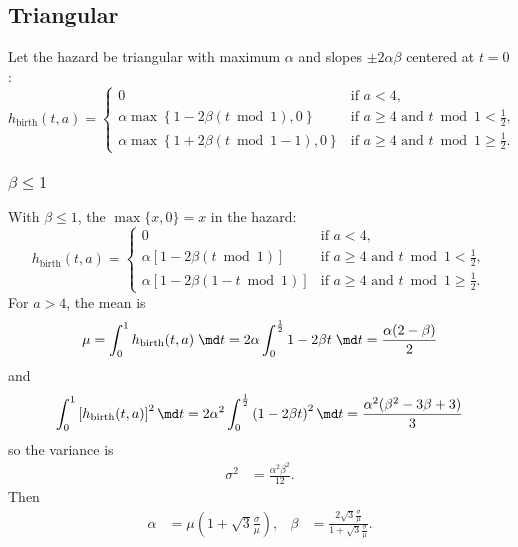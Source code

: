 \documentclass{jpmarticle}
\begin{document}
\subsection{Triangular}

Let the hazard be triangular with maximum $\alpha$ and slopes
$\pm 2 \alpha \beta$ centered at $t = 0$:
\begin{equation}
  h_{\text{birth}} (t, a) =
  \begin{cases}
    0 & \text{if $a < 4$},
    \\
    \alpha \max\left\{1 - 2 \beta (t \bmod 1), 0\right\}
    & \text{if $a \geq 4$ and $t \bmod 1 < \frac{1}{2}$},
    \\
    \alpha \max\left\{1 + 2 \beta (t \bmod 1 - 1), 0\right\}
    & \text{if $a \geq 4$ and $t \bmod 1 \geq \frac{1}{2}$}.
  \end{cases}
\end{equation}

\subsubsection{$\beta \leq 1$}

With $\beta \leq 1$, the $\max\{x, 0\} = x$ in the hazard:
\begin{equation}
  h_{\text{birth}} (t, a) =
  \begin{cases}
    0 & \text{if $a < 4$},
    \\
    \alpha \left[1 - 2 \beta (t \bmod 1)\right]
    & \text{if $a \geq 4$ and $t \bmod 1 < \frac{1}{2}$},
    \\
    \alpha \left[1 - 2 \beta (1 - t \bmod 1)\right]
    & \text{if $a \geq 4$ and $t \bmod 1 \geq \frac{1}{2}$}.
  \end{cases}
\end{equation}
For $a > 4$, the mean is
\begin{align}
  \mu = \int_0^1 h_{\text{birth}}(t, a) \; \md t
  = 2 \alpha \int_0^{\frac{1}{2}} 1 - 2 \beta t \; \md t
  = \frac{\alpha (2 - \beta)}{2}
\end{align}
and
\begin{align}
  \int_0^1 \left[h_{\text{birth}}(t, a)\right]^2 \md t
  = 2 \alpha^2 \int_0^{\frac{1}{2}} \left(1 - 2 \beta t\right)^2 \md t
  = \frac{\alpha^2 (\beta^2 - 3 \beta + 3)}{3}
\end{align}
so the variance is
\begin{align}
  \sigma^2
  &= \frac{\alpha^2 \beta^2}{12}.
\end{align}
Then
\begin{align}
  \alpha &= \mu \left(1 + \sqrt{3} \frac{\sigma}{\mu}\right),
  &
  \beta &= \frac{2 \sqrt{3} \frac{\sigma}{\mu}}
          {1 + \sqrt{3} \frac{\sigma}{\mu}}.
\end{align}
\end{document}
